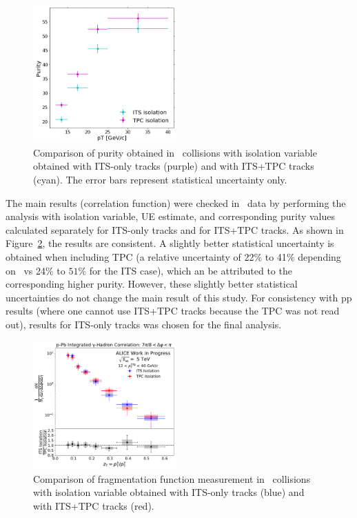 \begin{figure}[hbtp]
	\center
	\includegraphics[width=0.49\textwidth]{Checks_Systematics/PurityITSTPC.png}
	\caption{Comparison of purity obtained in \pPb~collisions with isolation variable obtained with ITS-only tracks (purple) and with ITS+TPC tracks (cyan). The error bars represent statistical uncertainty only. }
	\label{fig:ComparisonTPCITSiso_purity}
\end{figure}

The main results (correlation function) were checked in \pPb~data by performing the analysis with isolation variable, UE estimate, and corresponding purity values calculated separately for ITS-only tracks and for ITS+TPC tracks. As shown in Figure~\ref{fig:ComparisonTPCITSiso_frag}, the results are consistent. A slightly better statistical uncertainty is obtained when including TPC (a relative uncertainty of 22$\%$ to 41$\%$ depending on \zt~vs 24$\%$ to $51\%$ for the ITS case), which an be attributed to the corresponding higher purity. However, these slightly better statistical uncertainties do not change the main result of this study. For consistency with pp results (where one cannot use ITS+TPC tracks because the TPC was not read out), results for ITS-only tracks was chosen for the final analysis. 

\begin{figure}[hbtp]
	\center
	\includegraphics[width=0.49\textwidth]{Checks_Systematics/ISO_Compare_Final_FFunction_and_Ratio}
	\caption{Comparison of fragmentation function measurement in \pPb~collisions with isolation variable obtained with ITS-only tracks (blue) and with ITS+TPC tracks (red).}
	\label{fig:ComparisonTPCITSiso_frag}
\end{figure}

